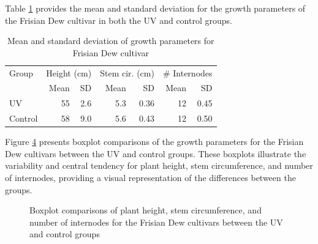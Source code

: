 Table \ref{tab:descriptive_statistics} provides the mean and standard deviation for the growth parameters of the Frisian Dew cultivar in both the UV and control groups.

\begin{table}[H]
    \caption[Mean and standard deviation of growth parameters]{Mean and standard deviation of growth parameters for Frisian Dew cultivar}
    \label{tab:descriptive_statistics}
    \begin{tabular}{lrrrrrr}
        \toprule
        Group & \multicolumn{2}{l}{Height (\unit[mode=text]{\cm})} & \multicolumn{2}{l}{Stem cir. (\unit[mode=text]{\cm})} & \multicolumn{2}{l}{\# Internodes} \\
        & Mean & SD & Mean & SD & Mean & SD \\
        \midrule
        UV & \num[mode=text]{55} & \num[mode=text]{2.6} & \num[mode=text]{5.3} & \num[mode=text]{0.36} & \num[mode=text]{12} & \num[mode=text]{0.45} \\
        Control & \num[mode=text]{58} & \num[mode=text]{9.0} & \num[mode=text]{5.6} & \num[mode=text]{0.43} & \num[mode=text]{12} & \num[mode=text]{0.50} \\
        \bottomrule
    \end{tabular}
\end{table}

Figure \ref{fig:boxplot_comparisons_growth_parameters} presents boxplot comparisons of the growth parameters for the Frisian Dew cultivars between the UV and control groups. These boxplots illustrate the variability and central tendency for plant height, stem circumference, and number of internodes, providing a visual representation of the differences between the groups.

\begin{figure}[H]
    \begin{subfigure}[t]{.32\textwidth}
        
        \label{fig:boxplot_comparison_height}
    \end{subfigure}
    \begin{subfigure}[t]{.32\textwidth}
        
        \label{fig:boxplot_comparison_stem-circumference}
    \end{subfigure}
    \begin{subfigure}[t]{.32\textwidth}
        
        \label{fig:boxplot_comparison_no-internodes}
    \end{subfigure}
    \caption[Comparison of growth parameters for Frisian Dew cultivars]{Boxplot comparisons of plant height, stem circumference, and number of internodes for the Frisian Dew cultivars between the UV and control groups}
    \label{fig:boxplot_comparisons_growth_parameters}
\end{figure}

